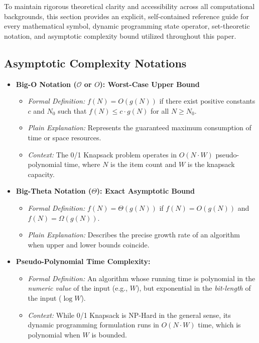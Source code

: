 \documentclass[10pt,journal,compsoc,onecolumn]{IEEEtran}
\begin{document}
To maintain rigorous theoretical clarity and accessibility across all computational backgrounds, this section provides an explicit, self-contained reference guide for every mathematical symbol, dynamic programming state operator, set-theoretic notation, and asymptotic complexity bound utilized throughout this paper.

\subsection{Asymptotic Complexity Notations}

\begin{itemize}
    \item \textbf{Big-O Notation ($\mathcal{O}$ or $O$): Worst-Case Upper Bound}
    \begin{itemize}
        \item \emph{Formal Definition:} $f(N) = O(g(N))$ if there exist positive constants $c$ and $N_0$ such that $f(N) \le c \cdot g(N)$ for all $N \ge N_0$.
        \item \emph{Plain Explanation:} Represents the guaranteed maximum consumption of time or space resources.
        \item \emph{Context:} The 0/1 Knapsack problem operates in $O(N \cdot W)$ pseudo-polynomial time, where $N$ is the item count and $W$ is the knapsack capacity.
    \end{itemize}

    \item \textbf{Big-Theta Notation ($\Theta$): Exact Asymptotic Bound}
    \begin{itemize}
        \item \emph{Formal Definition:} $f(N) = \Theta(g(N))$ if $f(N) = O(g(N))$ and $f(N) = \Omega(g(N))$.
        \item \emph{Plain Explanation:} Describes the precise growth rate of an algorithm when upper and lower bounds coincide.
    \end{itemize}

    \item \textbf{Pseudo-Polynomial Time Complexity:}
    \begin{itemize}
        \item \emph{Formal Definition:} An algorithm whose running time is polynomial in the \emph{numeric value} of the input (e.g., $W$), but exponential in the \emph{bit-length} of the input ($\log W$).
        \item \emph{Context:} While 0/1 Knapsack is NP-Hard in the general sense, its dynamic programming formulation runs in $O(N \cdot W)$ time, which is polynomial when $W$ is bounded.
    \end{itemize}
\end{itemize}
\end{document}
